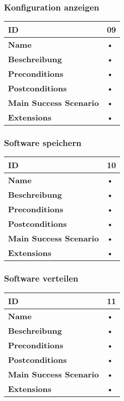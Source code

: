 \subsubsection{Konfiguration anzeigen}
\mbox{}
\begin{longtable}{| p{4cm} | p{11.7cm} |}
 \hline
 \textbf{ID} & 09\\ \hline 
 \textbf{Name} & • \\ \hline 
 \textbf{Beschreibung} & • \\ \hline 
 \textbf{Preconditions} & • \\ \hline 
 \textbf{Postconditions} & • \\ \hline 
 \textbf{Main Success Scenario} & • \\ \hline 
 \textbf{Extensions} & • \\ \hline 
 \end{longtable}
 
\subsubsection{Software speichern}
\mbox{}
\begin{longtable}{| p{4cm} | p{11.7cm} |}
 \hline
 \textbf{ID} & 10\\ \hline 
 \textbf{Name} & • \\ \hline 
 \textbf{Beschreibung} & • \\ \hline 
 \textbf{Preconditions} & • \\ \hline 
 \textbf{Postconditions} & • \\ \hline 
 \textbf{Main Success Scenario} & • \\ \hline 
 \textbf{Extensions} & • \\ \hline 
 \end{longtable}
 
\subsubsection{Software verteilen}
\mbox{}
\begin{longtable}{| p{4cm} | p{11.7cm} |}
 \hline
 \textbf{ID} & 11\\ \hline 
 \textbf{Name} & • \\ \hline 
 \textbf{Beschreibung} & • \\ \hline 
 \textbf{Preconditions} & • \\ \hline 
 \textbf{Postconditions} & • \\ \hline 
 \textbf{Main Success Scenario} & • \\ \hline 
 \textbf{Extensions} & • \\ \hline 
 \end{longtable}
 
